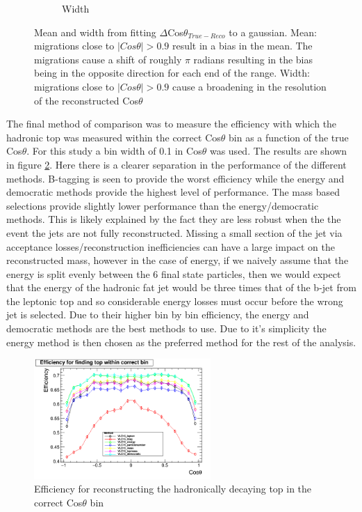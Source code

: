 \begin{figure}
\begin{subfigure}{.5\textwidth}
    \caption[Width]{Width}
  \end{subfigure}
  \caption[Mean and width from fitting $\Delta Cos\theta_{True-Reco}$ to a gaussian]{Mean and width from fitting $\Delta$Cos$\theta_{True-Reco}$ to a gaussian. Mean: migrations close to $\mid Cos\theta\mid>0.9$ result in a bias in the mean. The migrations cause a shift of roughly $\pi$ radians resulting in the bias being in the opposite direction for each end of the range. Width: migrations close to $\mid Cos\theta\mid>0.9$ cause a broadening in the resolution of the reconstructed Cos$\theta$}
  \label{fig:angleFitDiff}
\end{figure}

The final method of comparison was to measure the efficiency with which the hadronic top was measured within the correct Cos$\theta$ bin as a function of the true Cos$\theta$. For this study a bin width of 0.1 in Cos$\theta$ was used. The results are shown in figure \ref{fig:angularEfficiency}. Here there is a clearer separation in the performance of the different methods. B-tagging is seen to provide the worst efficiency while the energy and democratic methods provide the highest level of performance. The mass based selections provide slightly lower performance than the energy/democratic methods. This is likely explained by the fact they are less robust when the the event the jets are not fully reconstructed. Missing a small section of the jet via acceptance losses/reconstruction inefficiencies can have a large impact on the reconstructed mass, however in the case of energy, if we naively assume that the energy is split evenly between the 6 final state particles, then we would expect that the energy of the hadronic fat jet would be three times that of the b-jet from the leptonic top and so considerable energy losses must occur before the wrong jet is selected. Due to their higher bin by bin efficiency, the energy and democratic methods are the best methods to use. Due to it's simplicity the energy method is then chosen as the preferred method for the rest of the analysis. 

\begin{figure}
  \centering
  \includegraphics[width=0.6\textwidth]{figures/EfficiencyvsMCTheta.png}
  \caption[Efficiency for reconstructing the hadronically decaying top in the correct Cos$\theta$ bin]{Efficiency for reconstructing the hadronically decaying top in the correct Cos$\theta$ bin}
  \label{fig:angularEfficiency}
\end{figure}








